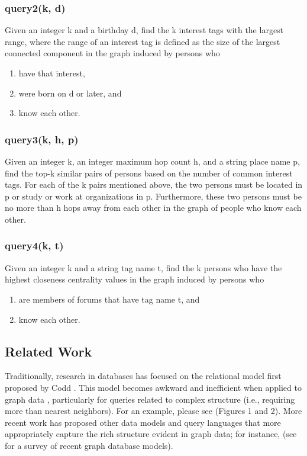 \documentclass{article}
\begin{document}
\subsubsection{query2(k, d)}
Given an integer k and a birthday d, find the k interest tags with the largest range, where the range of an interest tag is defined as the size of the largest connected component in the graph induced by persons who
\begin{enumerate}
\item have that interest,
\item were born on d or later, and
\item know each other.
\end{enumerate}

\subsubsection{query3(k, h, p)}
Given an integer k, an integer maximum hop count h, and a string place
name p, find the top-k similar pairs of persons based on the number of
common interest tags. For each of the k pairs mentioned above, the two
persons must be located in p or study or work at organizations in
p. Furthermore, these two persons must be no more than h hops away
from each other in the graph of people who know each other.

\subsubsection{query4(k, t)}
Given an integer k and a string tag name t, find the k persons who
have the highest closeness centrality values in the graph induced by
persons who
\begin{enumerate}
\item are members of forums that have tag name t, and
\item know each other.
\end{enumerate}


\subsection{Related Work}
Traditionally, research in databases has focused on the relational
model first proposed by Codd \cite{codd1970relational}.  This model
becomes awkward and inefficient when applied to graph data
\cite{rodriguez2011graph}, particularly for queries related to
complex structure (i.e., requiring more than nearest neighbors).  For
an example, please see \cite{he2008graphs} (Figures 1 and 2).  More
recent work has proposed other data models and query languages that
more appropriately capture the rich structure evident in graph data;
for instance,
\cite{he2008graphs,sun2012efficient,low2010graphlab} (see
\cite{angles2008survey} for a survey of recent graph database
models).  
\end{document}
